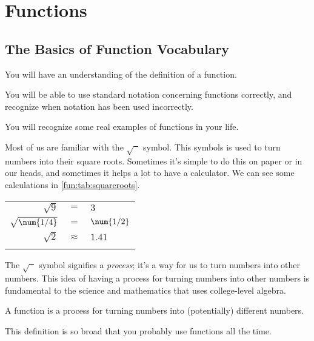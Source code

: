 \chapter{Functions}
\minitoc
\section{The Basics of Function Vocabulary}
\begin{outcomes}
	\begin{outcomelist}
		\item You will have an understanding of the definition of a function. 
		\item You will be able to use standard notation concerning functions 
		correctly, and recognize when notation has been used incorrectly.
		\item You will recognize some real examples of functions in your life.
	\end{outcomelist}
\end{outcomes}
%
Most of us are familiar with the $\sqrt{\phantom{x}}$ symbol. 
This symbols is used to turn numbers into their square roots. Sometimes it's 
simple to do this on paper or in our heads, and sometimes it helps a lot to 
have a calculator. We can see some calculations in \cref{fun:tab:squareroots}.
%
\begin{margintable}
	\centering
	 \label{fun:tab:squareroots}
	\begin{tabular}{r@{}c@{}l}
		\beforeheading
		\afterheading
		$\sqrt{\num{9}}$   & ${}={}$       & $\num{3}$    \\\normalline
		$\sqrt{\num{1/4}}$ & ${}={}$       & $\num{1/2}$  \\\normalline
		$\sqrt{\num{2}}$   & ${}\approx{}$ & $\num{1.41}$ \\\lastline
	\end{tabular}
\end{margintable}
%
The $\sqrt{\phantom{x}}$ symbol signifies a \emph{process}; it's a way for us to 
turn numbers into other numbers. This idea of having a process for turning numbers into other 
numbers is fundamental to the science and mathematics that uses college-level algebra. 
%
\begin{pccdefinition}[Function]
A function is a process for turning numbers into (potentially) different numbers.
\end{pccdefinition}
%
This definition is so broad that you probably use functions all the time. 

